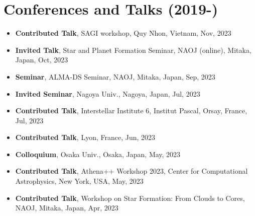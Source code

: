 \documentclass[11pt,letterpaper,roman]{moderncv}        %
\newenvironment{benumerate}[1]{
  \let\oldItem\item
  \def\item{\addtocounter{enumi}{-2}\oldItem}
  \begin{enumerate}[itemsep=0.0mm]
    \setcounter{enumi}{#1}
    \addtocounter{enumi}{1}
  }{
  \end{enumerate}
}
\begin{document}


\section{Conferences and Talks (2019-)}

\begin{itemize}
  \setlength\itemsep{0em}
\item \textbf{Contributed Talk},
  SAGI workshop, Quy Nhon, Vietnam, Nov, 2023 %
\item \textbf{Invited Talk},
  Star and Planet Formation Seminar, NAOJ (online), Mitaka, Japan, Oct, 2023 %
\item \textbf{Seminar},
  ALMA-DS Seminar, NAOJ, Mitaka, Japan, Sep, 2023 %
\item \textbf{Invited Seminar},
  Nagoya Univ., Nagoya, Japan, Jul, 2023 %
\item \textbf{Contributed Talk},
  Interstellar Institute 6, Institut Pascal, Orsay, France, Jul, 2023 %
\item \textbf{Contributed Talk},
  Lyon, France, Jun, 2023 %
\item \textbf{Colloquium},
  Osaka Univ., Osaka, Japan, May, 2023 %
\item \textbf{Contributed Talk},
  Athena++ Workshop 2023, Center for Computational Astrophysics, New York, USA, May, 2023 %
\item \textbf{Contributed Talk},
  Workshop on Star Formation: From Clouds to Cores, NAOJ, Mitaka, Japan, Apr, 2023 %

\end{itemize}
\end{document}
